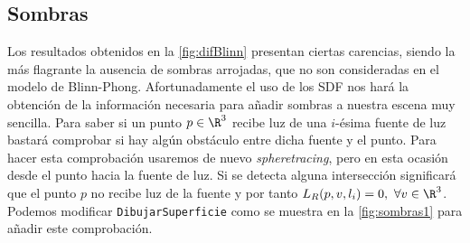\subsection{Sombras}
Los resultados obtenidos en la \autoref{fig:difBlinn} presentan ciertas carencias, siendo la más flagrante la ausencia de sombras arrojadas, que no son consideradas en el modelo de Blinn-Phong. Afortunadamente el uso de los SDF nos hará la obtención de la información necesaria para añadir sombras a nuestra escena muy sencilla. Para saber si un punto $p\in\R^3$ recibe luz de una $i$-ésima fuente de luz bastará comprobar si hay algún obstáculo entre dicha fuente y el punto. Para hacer esta comprobación usaremos de nuevo \textit{spheretracing}, pero en esta ocasión desde el punto hacia la fuente de luz. Si se detecta alguna intersección significará que el punto $p$ no recibe luz de la fuente y por tanto $L_R(p,v,l_i) = 0,\ \forall v\in \R^3$. Podemos modificar \texttt{DibujarSuperficie} como se muestra en la \autoref{fig:sombras1} para añadir este comprobación.\newline

